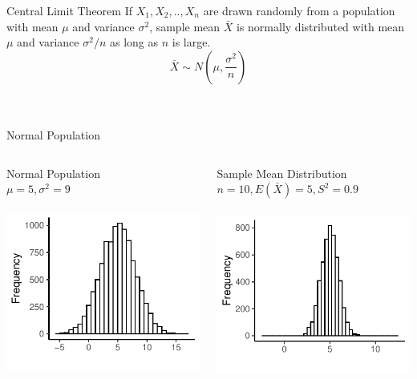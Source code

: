 \documentclass{./../div_teaching_slides}
\begin{document}
\begin{frame}{Central Limit Theorem}
\vspace{2em}
If $X_1, X_2,..,X_n$ are drawn randomly from a population with mean $\mu$ and variance $\sigma^2$, sample mean $\bar{X}$ is normally distributed with mean $\mu$ and variance $\sigma^2/n$ as long as $n$ is large.
$$\bar{X} \sim N\left(\mu, \dfrac{\sigma^2}{n}\right)$$ \\~\\
\href{https://stats-interactives.ctl.columbia.edu/central-limit-theorem}{}
\end{frame}

\begin{frame}{Normal Population}
\centering
\begin{columns}
\begin{column}{0.475\textwidth}
\centering
Normal Population \\ $\mu=5, \sigma^2 = 9$ \\~\\
\includegraphics{./../../output/clt_norm_pop.pdf}
\end{column}
\begin{column}{0.475\textwidth}
\centering
Sample Mean Distribution \\ $n=10, E(\bar{X})=5, S^2 = 0.9$ \\~\\
\includegraphics{./../../output/clt_norm_samp_n10.pdf}
\end{column}
\end{columns}
\end{frame}
\end{document}

